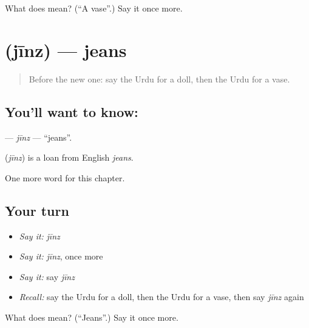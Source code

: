 \begin{tcolorbox}[breakable,colback=teal!4,colframe=teal!35!black,title={Before you move on}]
What does  mean? (\textquotedblleft{}A vase\textquotedblright{}.) Say it once more.
\end{tcolorbox}
\section[\texorpdfstring{\ur{جینز} (jīnz)}{جینز (jīnz)}]{ (jīnz) — jeans}

\label{lesson:UR-C251-jinz}



\begin{quote}
Before the new one: say the Urdu for a doll, then the Urdu for a vase.
\end{quote}

\subsection*{You'll want to know: }
\textbf{} — \emph{jīnz} — \textquotedblleft{}jeans\textquotedblright{}.

\begin{cousinweb}
\textbf{} (\emph{jīnz}) is a loan from English \emph{jeans}.
\end{cousinweb}

\begin{grammarlens}[title={What you've built}]
One more word for this chapter.
\end{grammarlens}

\subsection*{Your turn}
\begin{itemize}
\raggedright
  \item \emph{Say it:} \emph{jīnz}
  \item \emph{Say it:} \emph{jīnz}, once more
  \item \emph{Say it:} say \emph{jīnz}
  \item \emph{Recall:} say the Urdu for a doll, then the Urdu for a vase, then say \emph{jīnz} again
\end{itemize}

\begin{tcolorbox}[breakable,colback=teal!4,colframe=teal!35!black,title={Before you move on}]
What does  mean? (\textquotedblleft{}Jeans\textquotedblright{}.) Say it once more.
\end{tcolorbox}
